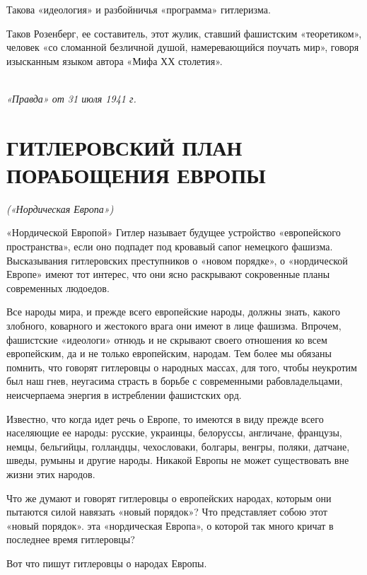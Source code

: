 \documentclass[12pt, a4paper, openany]{book}
\begin{document}
Такова «идеология» и разбойничья «программа» гитлеризма.

Таков Розенберг, ее составитель, этот жулик, ставший фашистским «теоретиком», человек «со сломанной безличной душой, намеревающийся поучать мир», говоря изысканным языком автора «Мифа ХХ столетия».

\ \\

\noindent\textit{«Правда» от 31 июля 1941 г.}

\newpage

\section[Гитлеровский план порабощения Европы \textit{(«Нордическая Европа»)}]{\center \textbf{ГИТЛЕРОВСКИЙ ПЛАН ПОРАБОЩЕНИЯ ЕВРОПЫ}}	

\begin{center}
	\textit{(«Нордическая Европа»)}
\end{center}

«Нордической Европой» Гитлер называет будущее устройство «европейского пространства», если оно подпадет под кровавый сапог немецкого фашизма. Высказывания гитлеровских преступников о «новом порядке», о «нордической Европе» имеют тот интерес, что они ясно раскрывают сокровенные планы современных людоедов.

Все народы мира, и прежде всего европейские народы, должны знать, какого злобного, коварного и жестокого врага они имеют в лице фашизма. Впрочем, фашистские «идеологи» отнюдь и не скрывают своего отношения ко всем европейским, да и не только европейским, народам. Тем более мы обязаны помнить, что говорят гитлеровцы о народных массах, для того, чтобы неукротим был наш гнев, неугасима страсть в борьбе с современными рабовладельцами, неисчерпаема энергия в истреблении фашистских орд.

Известно, что когда идет речь о Европе, то имеются в виду прежде всего населяющие ее народы: русские, украинцы, белоруссы, англичане, французы, немцы, бельгийцы, голландцы, чехословаки, болгары, венгры, поляки, датчане, шведы, румыны и другие народы. Никакой Европы не может существовать вне жизни этих народов.

Что же думают и говорят гитлеровцы о европейских народах, которым они пытаются силой навязать «новый порядок»? Что представляет собою этот «новый порядок». эта «нордическая Европа», о которой так много кричат в последнее время гитлеровцы?

Вот что пишут гитлеровцы о народах Европы.
\end{document}
